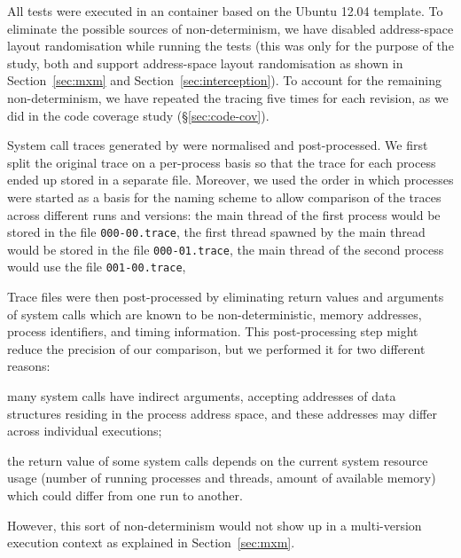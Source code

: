All tests were executed in an \lxc container based on the Ubuntu 12.04
template.  To eliminate the possible sources of non-determinism, we have
disabled address-space layout randomisation while running the tests (this was
only for the purpose of the study, both \mx and \varan support address-space
layout randomisation as shown in Section~\ref{sec:mxm} and
Section~\ref{sec:interception}).  To account for the remaining non-determinism,
we have repeated the tracing five times for each revision, as we did in the
code coverage study (\S\ref{sec:code-cov}).

System call traces generated by \perf were normalised and
post-processed. We first split the original trace on a per-process basis so
that the trace for each process ended up stored in a separate file.
Moreover, we used the order in which processes were started as a basis for the
naming scheme to allow comparison of the traces across different runs and
versions: the main thread of the first process would be stored in the file
\texttt{000-00.trace}, the first thread spawned by the main thread would be
stored in the file \texttt{000-01.trace}, the main thread of the second
process would use the file \texttt{001-00.trace}, \etc


Trace files were then post-processed by eliminating return values and arguments
of system calls which are known to be non-deterministic, \ie memory addresses,
process identifiers, and timing information. This post-processing step
might reduce the precision of our comparison, but we performed it for two
different reasons:%
\begin{inparaenum}[(1)]
\item many system calls have indirect arguments, accepting addresses of data
  structures residing in the process address space, and these addresses may
  differ across individual executions;
\item the return value of some system calls depends on the current system
  resource usage (\eg number of running processes and threads, amount of
  available memory) which could differ from one run to another.
\end{inparaenum}
However, this sort of non-determinism would not show up in a multi-version
execution context as explained in Section~\ref{sec:mxm}.

